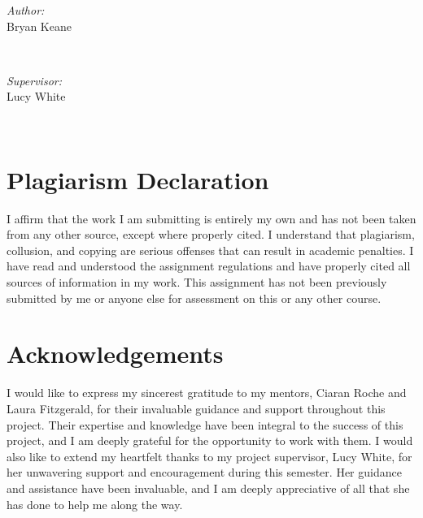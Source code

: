 \documentclass{article}
\begin{document}
\begin{titlepage}
    \begin{minipage}{0.4\textwidth}
    \begin{flushleft} \large
    \emph{Author:}\\
    Bryan Keane 
    \end{flushleft}
    \end{minipage}
    ~
    \begin{minipage}{0.4\textwidth}
    \begin{flushright} \large
    \emph{Supervisor:} \\
    Lucy White
    \end{flushright}
    \end{minipage}\\[2cm]
    
\end{titlepage}

\newpage

\tableofcontents
\newpage

\listoffigures
\newpage




\section{Plagiarism Declaration}
I affirm that the work I am submitting is entirely my own and has not been taken from any other source, except where properly cited. I understand that plagiarism, collusion, and copying are serious offenses that can result in academic penalties. I have read and understood the assignment regulations and have properly cited all sources of information in my work. This assignment has not been previously submitted by me or anyone else for assessment on this or any other course.

\newpage
\section{Acknowledgements}
I would like to express my sincerest gratitude to my mentors, Ciaran Roche and Laura Fitzgerald, for their invaluable guidance and support throughout this project. Their expertise and knowledge have been integral to the success of this project, and I am deeply grateful for the opportunity to work with them. I would also like to extend my heartfelt thanks to my project supervisor, Lucy White, for her unwavering support and encouragement during this semester. Her guidance and assistance have been invaluable, and I am deeply appreciative of all that she has done to help me along the way. 
\end{document}
